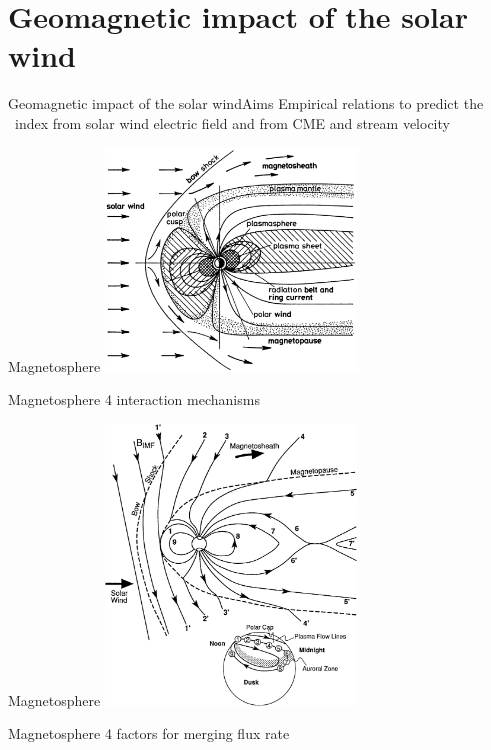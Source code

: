 \section{Geomagnetic impact of the solar wind}

\begin{frame}[plain,c]{Geomagnetic impact of the solar wind}{Aims}
	Empirical relations to predict the \Kp~index from solar wind electric field and from CME and stream velocity
\end{frame}

\begin{frame}[plain,c]{Magnetosphere}{}
	\includegraphics[width=0.5\textwidth]{../figures_of_others/images/Davies1990_magnetosphere_sharpened.png}
\end{frame}
\begin{frame}[plain,c]{Magnetosphere}{}
	4 interaction mechanisms
\end{frame}
\begin{frame}[plain,c]{Magnetosphere}{}
	\includegraphics[width=0.5\textwidth]{../figures_of_others/images/Kivelson1995_fig9_11_dungey_cycle.png}
\end{frame}
\begin{frame}[plain,c]{Magnetosphere}{}
	4 factors for merging flux rate
\end{frame}


